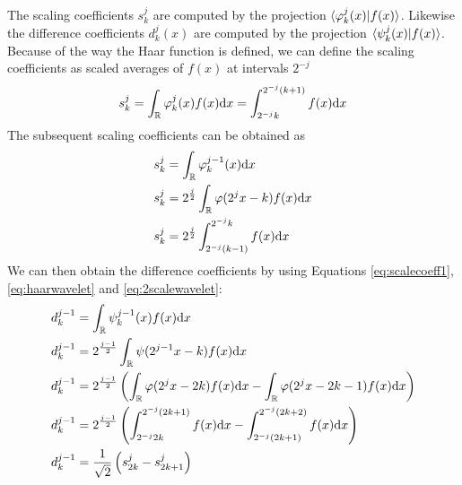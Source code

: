 \documentclass[../master_thesis.tex]{subfiles}
\begin{document}
The scaling coefficients $s^j_k$ are computed by the projection $\braket{\varphi^j_k(x)|f(x)}$.
Likewise the difference coefficients $d^j_k(x)$ are computed by the projection \newline$\braket{\psi^j_k(x)|f(x)}$.
Because of the way the Haar function is defined, we can define  the scaling coefficients as
scaled averages of $f(x)$ at intervals $2^{-j}$ \cite{Sorland, Beylkin:MRA}
\begin{equation}
  s^j_k = \int_{\mathbb{R}}\varphi^j_k(x)f(x)\text{d}x = \int^{2^{-j}(k + 1)}_{2^{-j}k} f(x) \text{d}x\label{eq:scalecoeff1}
\end{equation}
The subsequent scaling coefficients can be obtained as
\begin{align}
  \begin{split}\label{eq:scalecoeffint}
    s^{j}_k &= \int_{\mathbb{R}}\varphi^{j-1}_k(x)\text{d}x\\
    s^{j}_k &= 2^{\frac{j}{2}}\int_{\mathbb{R}}\varphi(2^{j}x - k)f(x)\text{d}x\\
    s^{j}_k &= 2^{\frac{j}{2}}\int_{2^{-j}(k-1)}^{2^{-j}k}f(x)\text{d}x\\
  \end{split}
\end{align}
We can then obtain the difference coefficients by using Equations \ref{eq:scalecoeff1}, \ref{eq:haarwavelet} and \ref{eq:2scalewavelet}:
\begin{align}
  \begin{split}\label{eq:diffcoeffint}
    d^{j - 1}_k &= \int_{\mathbb{R}}\psi^{j-1}_k(x)f(x)\text{d}x\\
    d^{j - 1}_k &= 2^{\frac{j - 1}{2}}\int_{\mathbb{R}}\psi(2^{j-1}x - k)f(x)\text{d}x\\
    d^{j - 1}_k &= 2^{\frac{j - 1}{2}}\left(\int_{\mathbb{R}}\varphi(2^jx - 2k)f(x)\text{d}x  - \int_{\mathbb{R}}\varphi(2^jx - 2k - 1)f(x)\text{d}x\right)\\
    d^{j - 1}_k &= 2^{\frac{j - 1}{2}}\left( \int^{2^{-j}(2k+1)}_{2^{-j}2k}f(x)\text{d}x - \int^{2^{-j}(2k+2)}_{2^{-j}(2k + 1)}f(x)\text{d}x \right)\\
    d^{j - 1}_k &= \frac{1}{\sqrt{2}}\left(s^{j}_{2k} - s^{j}_{2k+1} \right)
  \end{split}
\end{align}
\end{document}
